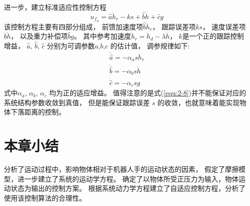 进一步，建立标准适应性控制方程 \cite{ref10}
\begin{equation}
  {u_{{f_n}}} = \hat a{\ddot h_r} - ks + \hat b\dot h + \hat cg
  \label{equ:2-7}
\end{equation}
该控制方程主要有四部分组成，
前馈加速度项$\hat b{\ddot h_r}$， 跟踪误差项$ks$，
速度误差项$\hat b\dot h$， 以及重力补偿项$\hat bg$。
其中参考加速度${\ddot h_r} = {\ddot h_d} - \lambda \dot h$，
$k$是一个正的跟踪控制增益， $\hat a$, $\hat b$, $\hat c$ 分别为可调参数$a$,$b$,$c$ 的估计值， 调参规律如下:
\begin{equation}
  \label{equ:2-8}
  \begin{array}{l}
    \dot{\hat a} = - {\alpha _a}s{{\ddot h}_r}\\
    \dot{\hat b} = - {\alpha _b}s\dot h\\
    \dot{\hat c} = - {\alpha _c}sg
  \end{array}
\end{equation}
式中${\alpha _a}$, ${\alpha _b}$, ${\alpha _c}$ 均为正的适应增益。
值得注意的是式(\ref{equ:2-8})并不能保证对应的系统结构参数收敛到真值，
但是能保证跟踪误差 $s$ 的收敛，也就意味着能实现物体下落距离的控制。


\section{本章小结}
分析了运动过程中，影响物体相对于机器人手的运动状态的因素，
假定了摩擦模型，进一步建立了系统的运动学方程。
确定了以物体所受正压力为输入，物体运动状态为输出的控制方案。
根据系统动力学方程建立了自适应控制方程，分析了使用该控制算法的合理性。

